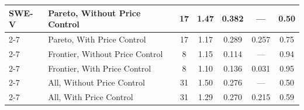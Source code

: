 \begin{table}[t]
\begin{tabular}{|l|l|c|c|c|c|c|}
SWE\mbox{-}V & Pareto, Without Price Control & 17 & 1.47 & 0.382 & --- & 0.50 \\ \cline{2-7}
\rowcolor{restrgray} \cellcolor{white} & Pareto, With Price Control & 17 & 1.17 & 0.289 & 0.257 & 0.75 \\ \cline{2-7}
\cellcolor{white} & Frontier, Without Price Control & 8 & 1.15 & 0.114 & --- & 0.94 \\ \cline{2-7}
\rowcolor{restrgray} \cellcolor{white} & Frontier, With Price Control & 8 & 1.10 & 0.136 & 0.031 & 0.95 \\ \cline{2-7}
\cellcolor{white} & All, Without Price Control & 31 & 1.50 & 0.276 & --- & 0.50 \\ \cline{2-7}
\rowcolor{restrgray} \cellcolor{white} & All, With Price Control & 31 & 1.29 & 0.270 & 0.215 & 0.59 \\
\hline

\end{tabular}
\end{table}
